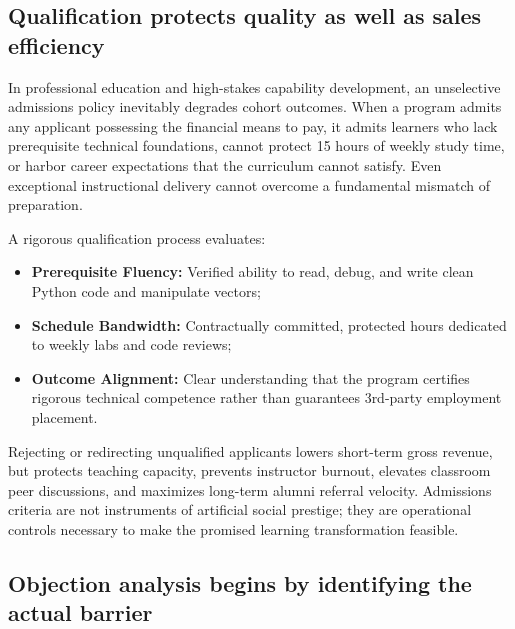 \subsection{Qualification protects quality as well as sales efficiency}

In professional education and high-stakes capability development, an unselective admissions policy inevitably degrades cohort outcomes. When a program admits any applicant possessing the financial means to pay, it admits learners who lack prerequisite technical foundations, cannot protect 15 hours of weekly study time, or harbor career expectations that the curriculum cannot satisfy. Even exceptional instructional delivery cannot overcome a fundamental mismatch of preparation.

A rigorous qualification process evaluates:
\begin{itemize}
\item \textbf{Prerequisite Fluency:} Verified ability to read, debug, and write clean Python code and manipulate vectors;
\item \textbf{Schedule Bandwidth:} Contractually committed, protected hours dedicated to weekly labs and code reviews;
\item \textbf{Outcome Alignment:} Clear understanding that the program certifies rigorous technical competence rather than guarantees 3rd-party employment placement.
\end{itemize}
Rejecting or redirecting unqualified applicants lowers short-term gross revenue, but protects teaching capacity, prevents instructor burnout, elevates classroom peer discussions, and maximizes long-term alumni referral velocity. Admissions criteria are not instruments of artificial social prestige; they are operational controls necessary to make the promised learning transformation feasible.

\subsection{Objection analysis begins by identifying the actual barrier}

